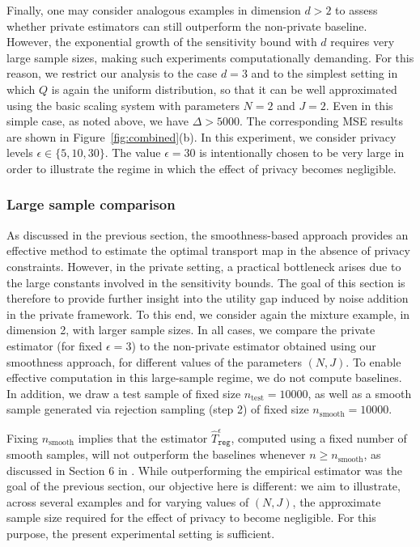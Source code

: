 \documentclass{article}
\newcommand{\1}{\mathds{1}}
\theoremstyle{plain}
\theoremstyle{definition}
\theoremstyle{remark}
\begin{document}
Finally, one may consider analogous examples in dimension $d > 2$ to assess whether private estimators can still outperform the non-private baseline. 
However, the exponential growth of the sensitivity bound with $d$ requires very large sample sizes, making such experiments computationally demanding.
For this reason, we restrict our analysis to the case $d = 3$ and to the simplest setting in which $Q$ is again the uniform distribution, so that it can be well approximated using the basic scaling system with parameters $N = 2$ and $J = 2$. 
Even in this simple case, as noted above, we have $\Delta > 5000$.
The corresponding MSE results are shown in Figure~\ref{fig:combined}(b). 
In this experiment, we consider privacy levels $\epsilon \in \{5, 10, 30\}$. 
The value $\epsilon = 30$ is intentionally chosen to be very large in order to illustrate the regime in which the effect of privacy becomes negligible.




\subsubsection{Large sample comparison}

As discussed in the previous section, the smoothness-based approach provides an effective method to estimate the optimal transport map in the absence of privacy constraints. However, in the private setting, a practical bottleneck arises due to the large constants involved in the sensitivity bounds. The goal of this section is therefore to provide further insight into the utility gap induced by noise addition in the private framework.
To this end, we consider again the mixture example, in dimension 2, with larger sample sizes. In all cases, we compare the private estimator (for fixed $\epsilon = 3$) to the non-private estimator obtained using our smoothness approach, for different values of the parameters $(N,J)$. To enable effective computation in this large-sample regime, we do not compute baselines. In addition, we draw a test sample of fixed size $n_{\text{test}} = 10000$, as well as a smooth sample generated via rejection sampling (step 2) of fixed size $n_{\text{smooth}} = 10000$.

Fixing $n_{\text{smooth}}$ implies that the estimator $\hat T_\texttt{reg}^\epsilon$, computed using a fixed number of smooth samples, will not outperform the baselines whenever $n \geq n_{\text{smooth}}$, as discussed in Section 6 in \cite{NilesWeed2019Minimax}. While outperforming the empirical estimator was the goal of the previous section, our objective here is different: we aim to illustrate, across several examples and for varying values of $(N,J)$, the approximate sample size required for the effect of privacy to become negligible. For this purpose, the present experimental setting is sufficient.
\end{document}
